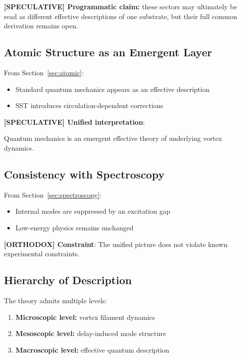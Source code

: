 \documentclass[11pt]{article}
\theoremstyle{definition}
\theoremstyle{plain}
\theoremstyle{remark}
\begin{document}
        \textbf{[SPECULATIVE] Programmatic claim:} these sectors may ultimately be read as different effective descriptions of one substrate, but their full common derivation remains open.
    
    \subsection{Atomic Structure as an Emergent Layer}
        
        From Section~\ref{sec:atomic}:
        
        \begin{itemize}
            \item Standard quantum mechanics appears as an effective description
            \item SST introduces circulation-dependent corrections
        \end{itemize}
        
        \textbf{[SPECULATIVE] Unified interpretation}:
        \begin{center}
            Quantum mechanics is an emergent effective theory of underlying vortex dynamics.
        \end{center}
    
    \subsection{Consistency with Spectroscopy}
        
        From Section~\ref{sec:spectroscopy}:
        
        \begin{itemize}
            \item Internal modes are suppressed by an excitation gap
            \item Low-energy physics remains unchanged
        \end{itemize}
        
        \textbf{[ORTHODOX] Constraint}:
        The unified picture does not violate known experimental constraints.
    
    \subsection{Hierarchy of Description}
        
        The theory admits multiple levels:
        
        \begin{enumerate}
            \item \textbf{Microscopic level:} vortex filament dynamics
            \item \textbf{Mesoscopic level:} delay-induced mode structure
            \item \textbf{Macroscopic level:} effective quantum description
        \end{enumerate}
    
\end{document}
